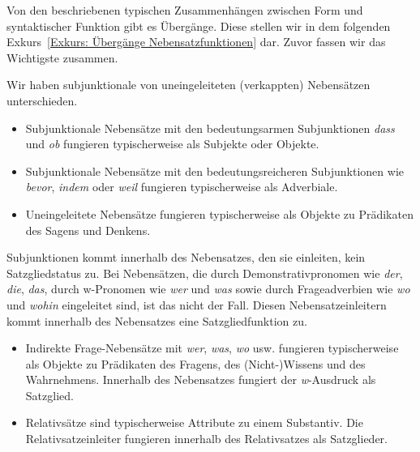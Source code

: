 Von den beschriebenen typischen Zusammenhängen zwischen Form und syntaktischer Funktion gibt es Übergänge. Diese stellen wir in dem folgenden Exkurs~\ref{Exkurs: Übergänge Nebensatzfunktionen} dar. Zuvor fassen wir das Wichtigste zusammen. 

\vspace{.2cm}

Wir haben subjunktionale von uneingeleiteten (verkappten) Nebensätzen unterschieden. 

\begin{itemize}
    \item Subjunktionale Nebensätze mit den bedeutungsarmen Subjunktionen \textit{dass} und \textit{ob} fungieren typischerweise als Subjekte oder Objekte.

    \item Subjunktionale Nebensätze mit den bedeutungsreicheren Subjunktionen wie \textit{bevor}, \textit{indem} oder \textit{weil} fungieren typischerweise als Adverbiale.

    \item Uneingeleitete Nebensätze fungieren typischerweise als Objekte zu Prädikaten des Sagens und Denkens.

\end{itemize}

Subjunktionen kommt innerhalb des Nebensatzes, den sie einleiten, kein Satzgliedstatus zu. Bei Nebensätzen, die durch Demonstrativpronomen wie \textit{der}, \textit{die}, \textit{das}, durch w-Pronomen wie \textit{wer} und \textit{was} sowie durch Frageadverbien wie \textit{wo} und \textit{wohin} eingeleitet sind, ist das nicht der Fall. Diesen Nebensatzeinleitern kommt innerhalb des Nebensatzes eine Satzgliedfunktion zu.

\begin{itemize}
    \item Indirekte Frage-Nebensätze mit \textit{wer}, \textit{was}, \textit{wo} usw. fungieren typischerweise als Objekte zu Prädikaten des Fragens, des (Nicht-)Wissens und des Wahrnehmens. Innerhalb des Nebensatzes fungiert der \textit{w}-Ausdruck als Satzglied.

    \item Relativsätze sind typischerweise Attribute zu einem Substantiv. Die Relativsatzeinleiter fungieren innerhalb des Relativsatzes als Satzglieder.
    
\end{itemize}


